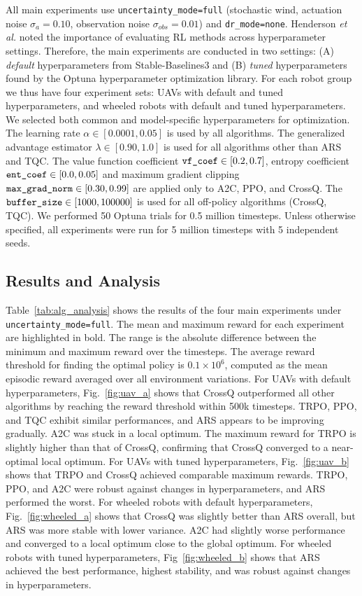 \documentclass[letterpaper, 10 pt, conference]{ieeeconf}  %
\begin{document}
All main experiments use \texttt{uncertainty\_mode=full} (stochastic wind, actuation noise $\sigma_a=0.10$, observation noise $\sigma_{obs}=0.01$) and \texttt{dr\_mode=none}. Henderson \textit{et al.}\cite{henderson2018deep} noted the importance of evaluating RL methods across hyperparameter settings. Therefore, the main experiments are conducted in two settings: (A) \emph{default} hyperparameters from Stable-Baselines3 and (B) \emph{tuned} hyperparameters found by the Optuna \cite{optuna_2019} hyperparameter optimization library. For each robot group we thus have four experiment sets: UAVs with default and tuned hyperparameters, and wheeled robots with default and tuned hyperparameters. We selected both common and model-specific hyperparameters for optimization. The learning rate $\alpha \in [0.0001, 0.05]$ is used by all algorithms. The generalized advantage estimator $\lambda \in [0.90, 1.0]$ is used for all algorithms other than ARS and TQC. The value function coefficient $\verb|vf_coef| \in [0.2, 0.7]$, entropy coefficient $\verb|ent_coef| \in [0.0, 0.05]$ and maximum gradient clipping $\verb|max_grad_norm| \in [0.30, 0.99]$ are applied only to A2C, PPO, and CrossQ. The $\verb|buffer_size| \in [1000, 100000]$ is used for all off-policy algorithms (CrossQ, TQC). We performed 50 Optuna trials for 0.5 million timesteps. Unless otherwise specified, all experiments were run for 5 million timesteps with 5 independent seeds.

\subsection{Results and Analysis}
Table~\ref{tab:alg_analysis} shows the results of the four main experiments under \texttt{uncertainty\_mode=full}. The mean and maximum reward for each experiment are highlighted in bold. The range is the absolute difference between the minimum and maximum reward over the timesteps. The average reward threshold for finding the optimal policy is $0.1 \times 10^6$, computed as the mean episodic reward averaged over all environment variations. For UAVs with default hyperparameters, Fig.~\ref{fig:uav_a} shows that CrossQ outperformed all other algorithms by reaching the reward threshold within 500k timesteps. TRPO, PPO, and TQC exhibit similar performances, and ARS appears to be improving gradually. A2C was stuck in a local optimum. The maximum reward for TRPO is slightly higher than that of CrossQ, confirming that CrossQ converged to a near-optimal local optimum. For UAVs with tuned hyperparameters, Fig.~\ref{fig:uav_b} shows that TRPO and CrossQ achieved comparable maximum rewards. TRPO, PPO, and A2C were robust against changes in hyperparameters, and ARS performed the worst. For wheeled robots with default hyperparameters, Fig.~\ref{fig:wheeled_a} shows that CrossQ was slightly better than ARS overall, but ARS was more stable with lower variance. A2C had slightly worse performance and converged to a local optimum close to the global optimum. For wheeled robots with tuned hyperparameters, Fig~\ref{fig:wheeled_b} shows that ARS achieved the best performance, highest stability, and was robust against changes in hyperparameters.
\end{document}
